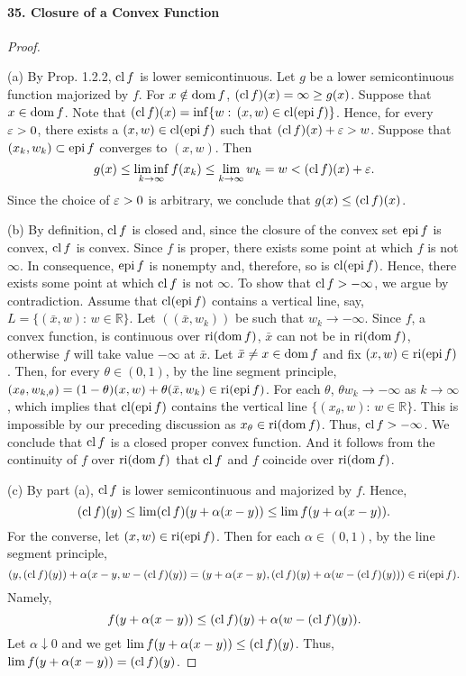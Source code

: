   \paragraph{35. Closure of a Convex Function}
  \begin{proof}
    $\,$\par
    (a) By Prop. 1.2.2, $\operatorname{cl} f$ is lower semicontinuous. Let $g$ be a lower
    semicontinuous function majorized by $f$. For $x\notin\operatorname{dom} f$, $(\operatorname{cl} f)(x)
    =\infty\ge g(x)$. Suppose that $x\in\operatorname{dom} f$. Note that $(\operatorname{cl} f)(x)=\inf\{
    w:\,(x,w)\in\operatorname{cl}(\operatorname{epi} f)\}$. Hence, for every $\varepsilon>0$, there exists a
    $(x,w)\in\operatorname{cl}(\operatorname{epi} f)$ such that $(\operatorname{cl} f)(x)+\varepsilon>w$. Suppose that $(x_k,
    w_k)\subset\operatorname{epi} f$ converges to $(x,w)$. Then
    \[
      g(x)\le\liminf_{k\to\infty}f(x_k)\le\lim_{k\to\infty}w_k
      =w < (\operatorname{cl} f)(x)+\varepsilon.
    \]
    Since the choice of $\varepsilon>0$ is arbitrary, we conclude that $g(x)\le(\operatorname{cl} f)
    (x)$.\par
    (b) By definition, $\operatorname{cl} f$ is closed and, since the closure of the convex
    set $\operatorname{epi} f$ is convex, $\operatorname{cl} f$ is convex. Since $f$ is proper, there 
    exists some point at which $f$ is not $\infty$. In consequence, $\operatorname{epi} f$ is
    nonempty and, therefore, so is $\operatorname{cl}(\operatorname{epi} f)$. Hence, there exists some 
    point at which $\operatorname{cl} f$ is not $\infty$. To show that $\operatorname{cl} f>-\infty$, we 
    argue by contradiction. Assume that $\operatorname{cl}(\operatorname{epi} f)$ contains a vertical line,
    say, $L=\{(\bar{x},w):\, w\in\mathbb{R}\}$. Let $((\bar{x},w_k))$ be such
    that $w_k\to-\infty$. Since $f$, a convex function, is continuous over
    $\operatorname{ri}(\operatorname{dom} f)$, $\bar{x}$ can not be in $\operatorname{ri}(\operatorname{dom} f)$, otherwise $f$ will 
    take value $-\infty$ at $\bar{x}$. Let $\bar{x}\ne x\in\operatorname{dom} f$ and fix $(x,
    w)\in\operatorname{ri}(\operatorname{epi} f)$. Then, for every $\theta\in(0,1)$, by the line segment
    principle, $(x_{\theta},w_{k,\theta})=(1-\theta)(x,w)+\theta(\bar{x},w_k)
    \in\operatorname{ri}(\operatorname{epi} f)$. For each $\theta$, $\theta w_k\to-\infty$ as $k\to\infty$,
    which implies that $\operatorname{cl}(\operatorname{epi} f)$ contains the vertical line $\{(x_\theta,w)
    :\,w\in\mathbb{R}\}$. This is impossible by our preceding discussion as
    $x_\theta\in\operatorname{ri}(\operatorname{dom} f)$. Thus, $\operatorname{cl} f>-\infty$. We conclude that $\operatorname{cl} f$ 
    is a closed proper convex function. And it follows from the continuity of
    $f$ over $\operatorname{ri}(\operatorname{dom} f)$ that $\operatorname{cl} f$ and $f$ coincide over $\operatorname{ri}(\operatorname{dom} f)$.
    \par
    (c) By part (a), $\operatorname{cl} f$ is lower semicontinuous and majorized by $f$. 
    Hence,
    \[
      (\operatorname{cl} f)(y)\le\lim(\operatorname{cl} f)(y+\alpha(x-y))\le\lim f(y+\alpha(x-y)).
    \]
    For the converse, let $(x,w)\in\operatorname{ri}(\operatorname{epi} f)$. Then for each $\alpha\in
    (0,1)$, by the line segment principle,
    \[
      (y, (\operatorname{cl} f)(y))+\alpha(x-y, w-(\operatorname{cl} f)(y))=
      (y+\alpha(x-y), (\operatorname{cl} f)(y)+\alpha(w-(\operatorname{cl} f)(y)))\in
      \operatorname{ri}(\operatorname{epi} f).
    \]
    Namely,
    \[
      f(y+\alpha(x-y))\le
      (\operatorname{cl} f)(y)+\alpha(w-(\operatorname{cl} f)(y)).
    \]
    Let $\alpha\downarrow 0$ and we get $\lim f(y+\alpha(x-y))\le(\operatorname{cl} f)(y)$.
    Thus, $\lim f(y+\alpha(x-y))=(\operatorname{cl} f)(y)$.
  \end{proof}

















